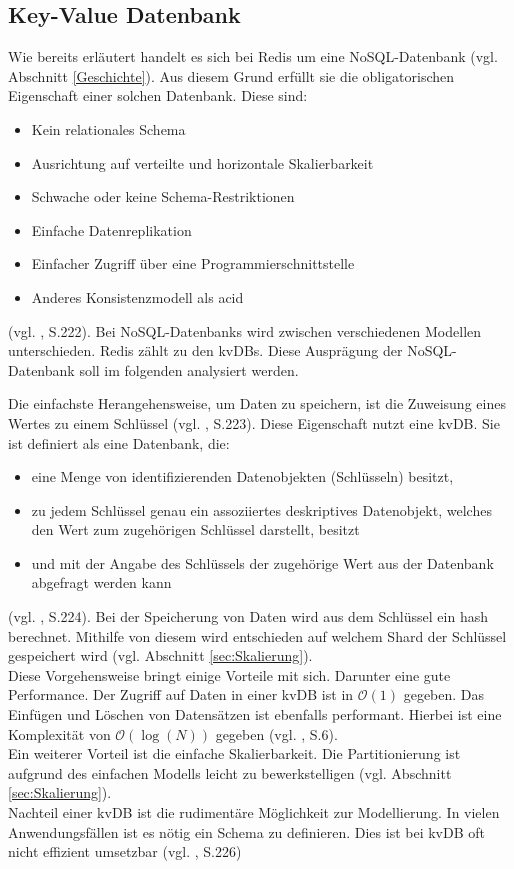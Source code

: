 
\subsection{Key-Value Datenbank}
Wie bereits erläutert handelt es sich bei \acs{Redis} um eine \acs{NoSQL-Datenbank} (vgl. Abschnitt \ref{Geschichte}). Aus diesem Grund erfüllt sie die obligatorischen Eigenschaft einer solchen Datenbank. Diese sind: 
\begin{itemize}
	\item Kein relationales Schema
	\item Ausrichtung auf verteilte und horizontale Skalierbarkeit 
	\item Schwache oder keine Schema-Restriktionen 
	\item Einfache Datenreplikation 
	\item Einfacher Zugriff über eine Programmierschnittstelle
	\item Anderes Konsistenzmodell als \gls{acid}
\end{itemize}
(vgl. \cite{1}, S.222). Bei \acp{NoSQL-Datenbank} wird zwischen verschiedenen Modellen unterschieden. \acs{Redis} zählt zu den \glspl{kvDB}. Diese Ausprägung der \acs{NoSQL-Datenbank} soll im folgenden analysiert werden. 

Die einfachste Herangehensweise, um Daten zu speichern, ist die Zuweisung eines Wertes zu einem Schlüssel (vgl. \cite{1}, S.223). Diese Eigenschaft nutzt eine \gls{kvDB}. Sie ist definiert als eine Datenbank, die:
\begin{itemize}
	\item  eine Menge von identifizierenden Datenobjekten (Schlüsseln) besitzt,
	\item  zu jedem Schlüssel genau ein assoziiertes deskriptives Datenobjekt, welches den Wert zum zugehörigen Schlüssel darstellt, besitzt
	\item und mit der Angabe des Schlüssels der zugehörige Wert aus der Datenbank abgefragt werden kann
\end{itemize}
(vgl. \cite{1}, S.224). Bei der Speicherung von Daten wird aus dem Schlüssel ein \gls{hash} berechnet. Mithilfe von diesem wird entschieden auf welchem Shard der Schlüssel gespeichert wird (vgl. Abschnitt \ref{sec:Skalierung}).
\\Diese Vorgehensweise bringt einige Vorteile mit sich. Darunter eine gute Performance. Der Zugriff auf Daten in einer \gls{kvDB} ist in $\mathcal{O}(1)$ gegeben. Das Einfügen und Löschen von Datensätzen ist ebenfalls performant. Hierbei ist eine Komplexität von $\mathcal{O}(\log{(N)})$ gegeben (vgl. \cite{keyValueComp}, S.6). 
\\Ein weiterer Vorteil ist die einfache Skalierbarkeit. Die Partitionierung ist aufgrund des einfachen Modells leicht zu bewerkstelligen (vgl. Abschnitt \ref{sec:Skalierung}).
\\Nachteil einer \gls{kvDB} ist die rudimentäre Möglichkeit zur Modellierung. In vielen Anwendungsfällen ist es nötig ein Schema zu definieren. Dies ist bei \gls{kvDB} oft nicht effizient umsetzbar (vgl. \cite{1}, S.226)